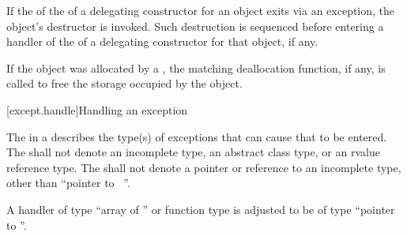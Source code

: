 \pnum
If the 
of the 
of a delegating constructor
for an object exits via
an exception, the object's destructor is invoked.
Such destruction is sequenced before entering a handler of the
 of a delegating constructor for that object, if any.

\pnum
\begin{note}
If the object was allocated by a ,
the matching deallocation function,
if any, is called to free the storage occupied by the object.
\end{note}


[except.handle]{Handling an exception}
%

\pnum
The
in a
describes the type(s) of exceptions that can cause
that
to be entered.
%
%
%
%
The
shall not denote an incomplete type, an abstract class type, or an rvalue reference type.
The
shall not denote a pointer or reference to an
incomplete type, other than ``pointer to \cv{}~''.

\pnum
A handler of type
%
``array of '' or
%
function type 
is adjusted to be of type
``pointer to ''.

